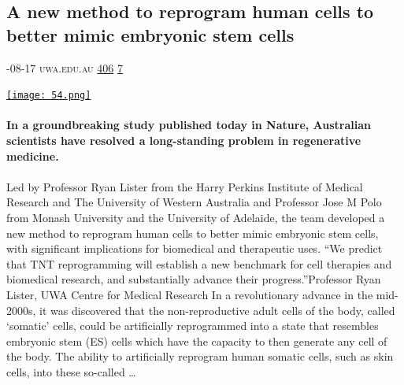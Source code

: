 \documentclass[10pt,a4paper]{article}
\begin{document}
\begin{multicols}{2}
\begin{minipage}{\linewidth}
\subsection{A new method to reprogram human cells to better mimic embryonic stem cells}
\textsc{\footnotesize
{\scriptsize\faCalendar}-08-17 
{\scriptsize\faGlobe}\space 
uwa.edu.au 
{\scriptsize\faThumbsOUp}\space 
\href{http://news.ycombinator.com/item?id=37286860\&utm\_term=comment}{406} 
{\scriptsize\faComments}\space 
\href{http://news.ycombinator.com/item?id=37286860\&utm\_term=comment}{7} 
}
\par\medskip\noindent
\href{https://www.uwa.edu.au/news/Article/2023/August/Scientists-find-way-to-wipe-a-cells-memory-to-reprogram-it-as-a-stem-cell?utm\_source=hackernewsletter\&utm\_medium=email\&utm\_term=learn}{
    \texttt{[image: 54.png]}
}
\end{minipage}
\paragraph{}
\textbf{In a groundbreaking study published today in Nature, Australian scientists have resolved a long-standing problem in regenerative medicine.}
\paragraph{}
 Led by Professor Ryan Lister from the Harry Perkins Institute of Medical Research and The University of Western Australia and Professor Jose M Polo from Monash University and the University of Adelaide, the team developed a new method to reprogram human cells to better mimic embryonic stem cells, with significant implications for biomedical and therapeutic uses.
“We predict that TNT reprogramming will establish a new benchmark for cell therapies and biomedical research, and substantially advance their progress.”Professor Ryan Lister, UWA Centre for Medical Research
In a revolutionary advance in the mid-2000s, it was discovered that the non-reproductive adult cells of the body, called ‘somatic’ cells, could be artificially reprogrammed into a state that resembles embryonic stem (ES) cells which have the capacity to then generate any cell of the body.
The ability to artificially reprogram human somatic cells, such as skin cells, into these so-called
\dots\par
\noindent\begin{minipage}{\linewidth}
\medskip

\end{minipage}
\end{multicols}
\end{document}
